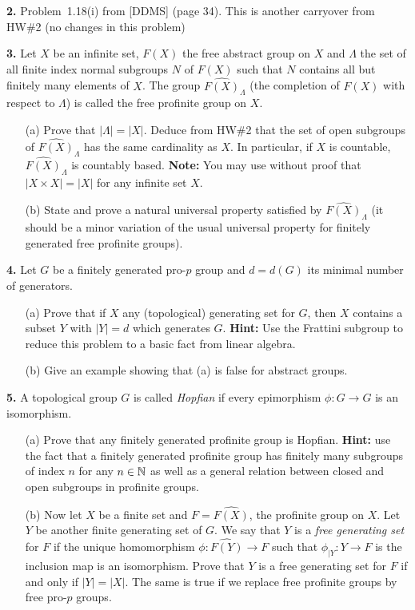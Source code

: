 \documentclass[12pt]{amsart}
\begin{document}
\skv
{\bf 2.} Problem~1.18(i) from [DDMS] (page 34). This is another carryover from HW\#2 (no changes in this problem)
\skv

{\bf 3.} Let $X$ be an infinite set, $F(X)$ the free abstract group on $X$ and $\Lambda$ the set of all finite index normal
subgroups $N$ of $F(X)$ such that $N$ contains all but finitely many elements of $X$. The group 
$\widehat{F(X)}_{\Lambda}$ (the completion of $F(X)$ with respect to $\Lambda$) is called the free profinite group on $X$.
\begin{itemize}
\item[(a)] Prove that $|\Lambda|=|X|$. Deduce from HW\#2 that the set of open subgroups of $\widehat{F(X)}_{\Lambda}$ 
has the same cardinality as $X$. In particular, if $X$ is countable, $\widehat{F(X)}_{\Lambda}$ is countably based.
{\bf Note:} You may use without proof that $|X\times X|=|X|$ for any infinite set $X$.
\item[(b)] State and prove a natural universal property satisfied by $\widehat{F(X)}_{\Lambda}$ (it should be a minor
variation of the usual universal property for finitely generated free profinite groups).
\end{itemize}
\skv
{\bf 4.} Let $G$ be a finitely generated pro-$p$ group and $d=d(G)$ its minimal number of generators.
\begin{itemize}
\item[(a)] Prove that if $X$ any (topological) generating set for $G$, then $X$ contains a subset $Y$ with $|Y|=d$
which generates $G$. {\bf Hint:} Use the Frattini subgroup to reduce this problem to a basic fact from linear algebra.
\item[(b)] Give an example showing that (a) is false for abstract groups.
\end{itemize}
\skv
{\bf 5.} A topological group $G$ is called {\it Hopfian} if every epimorphism $\phi:G\to G$ is an isomorphism.
 \begin{itemize}
\item[(a)] Prove that any finitely generated profinite group is Hopfian. {\bf Hint: } use the fact that a finitely generated
profinite group has finitely many subgroups of index $n$ for any $n\in{\mathbb N}$ as well as a general relation between closed and open subgroups in profinite groups. 
\item[(b)] Now let $X$ be a finite set and $F=\widehat{F(X)}$, the profinite group on $X$. Let $Y$ be another finite generating set of $G$. We say that $Y$ is a {\it free generating set} for $F$ if the unique homomorphism $\phi:\widehat{F(Y)}\to F$ such that
$\phi_{|Y}:Y\to F$ is the inclusion map is an isomorphism. Prove that $Y$ is a free generating set for $F$ if and only if $|Y|=|X|$.
The same is true if we replace free profinite groups by free pro-$p$ groups.
\end{itemize}
\end{document}
